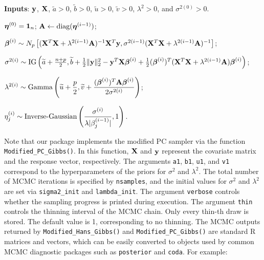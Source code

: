 \begin{algorithm}[!ht]
\caption{Modified PC Gibbs sampler}\label{Or_Gibbs}
\begin{algorithmic}[1]

\vspace{1mm}
\State \textbf{Inputs}: ${\bf y}$, ${\bf X}$, $\widetilde{a}>0$, $\widetilde{b}>0$, $\widetilde{u}>0$, $\widetilde{v}>0$, $\lambda^2>0$, and $\sigma^{2(0)}>0$. 

\vspace{1mm}
\State ${\boldsymbol \eta}^{(0)} = {\bf 1}_n$;
\State ${\bf A} \leftarrow \text{diag}({\boldsymbol \eta}^{(i-1)})$;

\vspace{1mm}
\State ${\boldsymbol \beta}^{(i)} \sim N_p\left[
    ({\bf X}^T{\bf X} + \lambda^{2(i-1)}{\bf A})^{-1}{\bf X}^T{\bf y},
    \sigma^{2(i-1)}({\bf X}^T{\bf X} + \lambda^{2(i-1)}{\bf A})^{-1}
\right]$;  

\vspace{1mm}
\State $\sigma^{2(i)} \sim \text{IG}\left(
    \widetilde{a} + \tfrac{n+p}{2},
    \widetilde{b} + \tfrac{1}{2}\| {\bf y} \|_2^2 
      - {\bf y}^T{\bf X} {\boldsymbol \beta}^{(i)}
      + \tfrac{1}{2}({\boldsymbol \beta}^{(i)})^T({\bf X}^T{\bf X} + \lambda^{2(i-1)}{\bf A}) {\boldsymbol \beta}^{(i)} \right)$;

\vspace{1mm}
\State $\displaystyle \lambda^{2(i)} \sim \text{Gamma}\left(
    \widetilde{u} + \frac{p}{2},
    \widetilde{v} + \frac{({\boldsymbol \beta}^{(i)})^T{\bf A}{\boldsymbol \beta}^{(i)}}{2\sigma^{2(i)}} 
\right)$;

\vspace{1mm}
\State $\displaystyle \eta^{(i)}_j \sim \text{Inverse-Gaussian}\left( \frac{\sigma^{(i)}}{\lambda|\beta_j^{(i-1)}|},1 \right)$.
\EndFor

\EndFor
\end{algorithmic}
\end{algorithm}
Note that our  package implements the modified PC sampler via the function
\texttt{Modified\_PC\_Gibbs()}. In this function, ${\bf X}$ and ${\bf y}$ represent the covariate matrix and the response vector, respectively. The arguments \texttt{a1}, \texttt{b1}, \texttt{u1}, and \texttt{v1} correspond to the hyperparameters of the priors for $\sigma^2$ and $\lambda^2$. The total number of MCMC iterations is specified by \texttt{nsamples}, and the initial values for $\sigma^2$ and $\lambda^2$ are set via \texttt{sigma2\_init} and \texttt{lambda\_init}. The argument \texttt{verbose} controls whether the sampling progress is printed during execution. The argument \texttt{thin} controls the thinning interval of the MCMC chain. Only every thin-th draw is stored. The default value is 1, corresponding to no thinning. The MCMC outputs returned by \texttt{Modified\_Hans\_Gibbs()} and 
\texttt{Modified\_PC\_Gibbs()} are standard R matrices and vectors, which can 
be easily converted to objects used by common MCMC diagnostic packages such as 
\texttt{posterior} and \texttt{coda}. For example:

